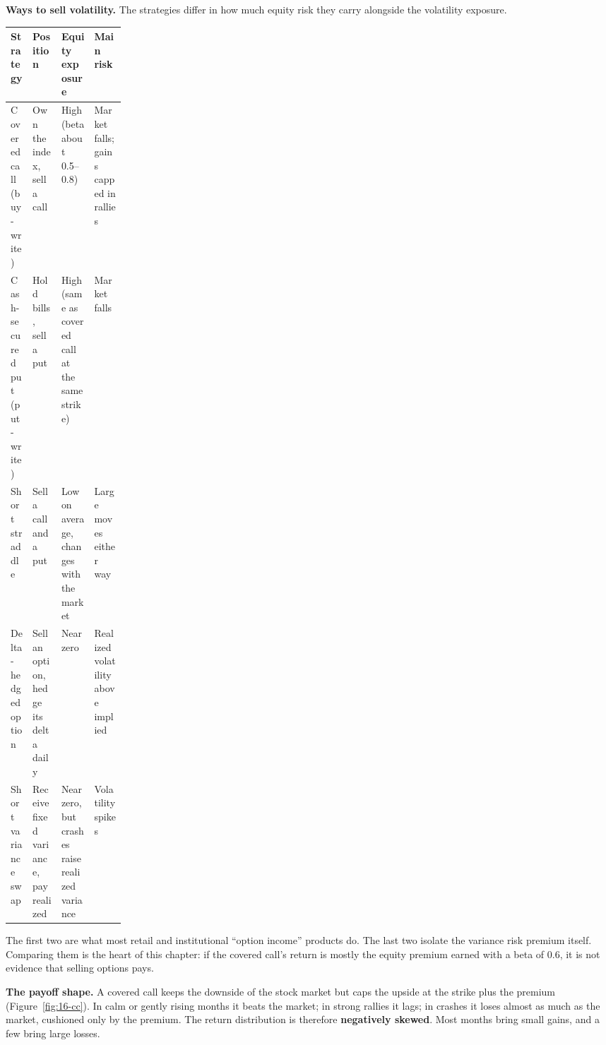 \textbf{Ways to sell volatility.} The strategies differ in how much equity risk they carry alongside the volatility exposure.

\begin{center}
\small
\begin{tabularx}{0.9\linewidth}{@{}>{\raggedright\arraybackslash}p{0.19\linewidth}>{\raggedright\arraybackslash}X>{\raggedright\arraybackslash}X>{\raggedright\arraybackslash}X@{}}
\toprule
Strategy & Position & Equity exposure & Main risk \\
\midrule
Covered call (buy-write) & Own the index, sell a call & High (beta about 0.5--0.8) & Market falls; gains capped in rallies \\
Cash-secured put (put-write) & Hold bills, sell a put & High (same as covered call at the same strike) & Market falls \\
Short straddle & Sell a call and a put & Low on average, changes with the market & Large moves either way \\
Delta-hedged option & Sell an option, hedge its delta daily & Near zero & Realized volatility above implied \\
Short variance swap & Receive fixed variance, pay realized & Near zero, but crashes raise realized variance & Volatility spikes \\
\bottomrule
\end{tabularx}
\end{center}

The first two are what most retail and institutional ``option income'' products do. The last two isolate the variance risk premium itself. Comparing them is the heart of this chapter: if the covered call's return is mostly the equity premium earned with a beta of 0.6, it is not evidence that selling options pays.

\textbf{The payoff shape.} A covered call keeps the downside of the stock market but caps the upside at the strike plus the premium (Figure~\ref{fig:16-cc}). In calm or gently rising months it beats the market; in strong rallies it lags; in crashes it loses almost as much as the market, cushioned only by the premium. The return distribution is therefore \textbf{negatively skewed}. Most months bring small gains, and a few bring large losses.

